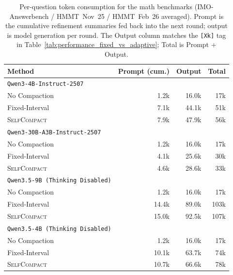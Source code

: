 \documentclass{article}
\newcommand{\method}{\textsc{{SelfCompact}}}
\begin{document}
\begin{table}[h!]
\centering
\small
\caption{Per-question token consumption for the math benchmarks
(IMO-Answerbench / HMMT~Nov~25 / HMMT~Feb~26 averaged). Prompt is the
cumulative refinement summaries fed back into the next round; output is
model generation per round. The Output column matches the
\texttt{[Xk]} tag in Table~\ref{tab:performance_fixed_vs_adaptive};
Total is Prompt + Output.}
\label{tab:tokens_math}
\setlength{\tabcolsep}{6pt}
\begin{tabular}{lrrr}
\toprule
\textbf{Method} & \textbf{Prompt (cum.)} & \textbf{Output} & \textbf{Total} \\
\midrule
\texttt{Qwen3-4B-Instruct-2507} \\[2pt]
\quad No Compaction        & 1.2k  &  16.0k &  17k \\
\quad Fixed-Interval       & 7.1k  &  44.1k &  51k \\
\quad \method{} & 7.9k  &  47.9k &  56k \\
\midrule
\texttt{Qwen3-30B-A3B-Instruct-2507} \\[2pt]
\quad No Compaction        & 1.2k  &  16.0k &  17k \\
\quad Fixed-Interval       & 4.1k  &  25.6k &  30k \\
\quad \method{}  & 4.6k  &  28.6k &  33k \\
\midrule
\texttt{Qwen3.5-9B (Thinking Disabled)} \\[2pt]
\quad No Compaction        & 1.2k  &  16.0k &  17k \\
\quad Fixed-Interval       & 14.4k &  89.0k & 103k \\
\quad \method{}  & 15.0k &  92.5k & 107k \\
\midrule
\texttt{Qwen3.5-4B (Thinking Disabled)} \\[2pt]
\quad No Compaction        & 1.2k  &  16.0k &  17k \\
\quad Fixed-Interval       & 10.1k &  63.7k &  74k \\
\quad \method{} & 10.7k &  66.6k &  78k \\
\bottomrule
\end{tabular}
\end{table}
\end{document}
